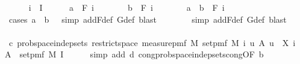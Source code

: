 \begin{isabellebody}
\ \ \ \ \isamarkupfalse%
\ {\isachardoublequoteopen}i\ {\isasymin}\ I{\isachardoublequoteclose}\isanewline
\ \ \ \ \isamarkupfalse%
\ {\isachardoublequoteopen}a\ {\isasymin}\ F\ i{\isachardoublequoteclose}\isanewline
\ \ \ \ \isamarkupfalse%
\ \isamarkupfalse%
\ {\isachardoublequoteopen}b\ {\isasymin}\ F\ i{\isachardoublequoteclose}\isanewline
\ \ \ \ \isamarkupfalse%
\ \isamarkupfalse%
\ {\isachardoublequoteopen}a\ {\isasyminter}\ b\ {\isasymin}\ {\isacharparenleft}{\kern0pt}F\ i{\isacharparenright}{\kern0pt}{\isachardoublequoteclose}\isanewline
\ \ \ \ \ \ \isamarkupfalse%
\ {\isacharparenleft}{\kern0pt}cases\ {\isachardoublequoteopen}a\ {\isasyminter}\ b\ {\isacharequal}{\kern0pt}\ {\isacharbraceleft}{\kern0pt}{\isacharbraceright}{\kern0pt}{\isachardoublequoteclose}{\isacharcomma}{\kern0pt}\ simp\ add{\isacharcolon}{\kern0pt}F{\isacharunderscore}{\kern0pt}def\ G{\isacharunderscore}{\kern0pt}def{\isacharcomma}{\kern0pt}\ blast{\isacharparenright}{\kern0pt}\isanewline
\ \ \ \ \ \ \isamarkupfalse%
\ {\isacharparenleft}{\kern0pt}simp\ add{\isacharcolon}{\kern0pt}F{\isacharunderscore}{\kern0pt}def\ G{\isacharunderscore}{\kern0pt}def{\isacharcomma}{\kern0pt}\ blast{\isacharparenright}{\kern0pt}\isanewline
\ \ \isamarkupfalse%
\isanewline
\isanewline
\ \ \isamarkupfalse%
\ c{\isacharcolon}{\kern0pt}\ {\isachardoublequoteopen}prob{\isacharunderscore}{\kern0pt}space{\isachardot}{\kern0pt}indep{\isacharunderscore}{\kern0pt}sets\ {\isacharparenleft}{\kern0pt}restrict{\isacharunderscore}{\kern0pt}space\ {\isacharparenleft}{\kern0pt}measure{\isacharunderscore}{\kern0pt}pmf\ M{\isacharparenright}{\kern0pt}\ {\isacharparenleft}{\kern0pt}set{\isacharunderscore}{\kern0pt}pmf\ M{\isacharparenright}{\kern0pt}{\isacharparenright}{\kern0pt}\ {\isacharparenleft}{\kern0pt}{\isasymlambda}i{\isachardot}{\kern0pt}\ {\isacharbraceleft}{\kern0pt}u{\isachardot}{\kern0pt}\ {\isasymexists}A{\isachardot}{\kern0pt}\ u\ {\isacharequal}{\kern0pt}\ X\ i\ {\isacharminus}{\kern0pt}{\isacharbackquote}{\kern0pt}\ A\ {\isasyminter}\ set{\isacharunderscore}{\kern0pt}pmf\ M{\isacharbraceright}{\kern0pt}{\isacharparenright}{\kern0pt}\ I{\isachardoublequoteclose}\isanewline
\ \ \ \ \isamarkupfalse%
\ {\isacharparenleft}{\kern0pt}simp\ add{\isacharcolon}{\kern0pt}\ d\ cong{\isacharcolon}{\kern0pt}prob{\isacharunderscore}{\kern0pt}space{\isachardot}{\kern0pt}indep{\isacharunderscore}{\kern0pt}sets{\isacharunderscore}{\kern0pt}cong{\isacharbrackleft}{\kern0pt}OF\ b{\isacharbrackright}{\kern0pt}{\isacharparenright}{\kern0pt}\isanewline

\end{isabellebody}
